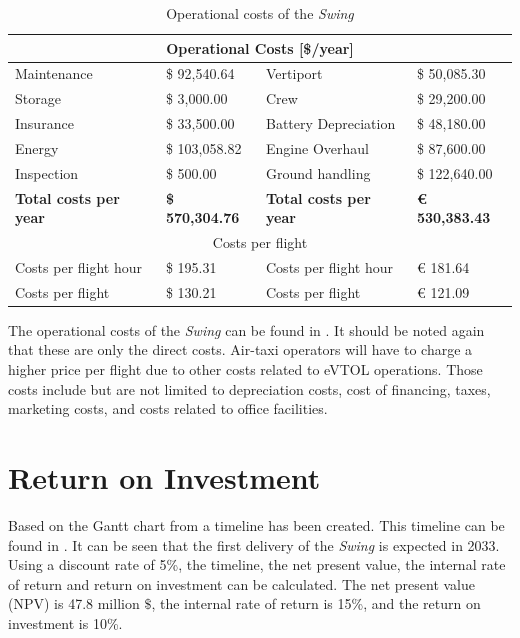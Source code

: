 \begin{table}[h]
\centering
\caption{Operational costs of the \textit{Swing}}
\label{tab:cost:operational:costs}
\begin{tabular}{l|l|l|l}
\toprule
\multicolumn{4}{c}{Operational Costs {[}\$/year{]}}                         \\ \midrule
Maintenance & \$    92,540.64      & Vertiport            & \$    50,085.30 \\
Storage     & \$       3,000.00    & Crew                 & \$    29,200.00 \\
Insurance   & \$    33,500.00      & Battery Depreciation & \$    48,180.00 \\
Energy      & \$ 103,058.82        & Engine Overhaul      & \$    87,600.00 \\
Inspection  & \$            500.00 & Ground handling      & \$ 122,640.00   \\ \midrule
\textbf{Total costs per year} & \textbf{\$ 570,304.76}   & \textbf{Total costs per year} & \textbf{€ 530,383.43}   \\ \toprule
\multicolumn{4}{c}{Costs per flight}                                        \\ \midrule
Costs per flight hour         & \$            195.31     & Costs per flight hour         & €            181.64     \\
Costs per flight              & \$            130.21     & Costs per flight              & €            121.09     \\
 \bottomrule
\end{tabular}
\end{table}

The operational costs of the \textit{Swing} can be found in .
It should be noted again that these are only the direct costs.
Air-taxi operators will have to charge a higher price per flight due to other costs related to eVTOL operations. Those costs include but are not limited to depreciation costs, cost of financing, taxes, marketing costs, and costs related to office facilities.

\section{Return on Investment}
\label{sec:Return_On_Investment}
Based on the Gantt chart from  a timeline has been created. This timeline can be found in . It can be seen that the first delivery of the \textit{Swing} is expected in 2033. Using a discount rate of 5\%, the timeline, the net present value, the internal rate of return and return on investment can be calculated. The net present value (NPV) is 47.8 million $\$$, the internal rate of return is 15\%, and the return on investment is 10\%.

